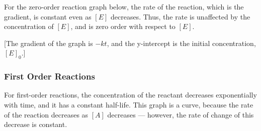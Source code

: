 				For the zero-order reaction graph below, the rate of the reaction, which is the gradient, is constant even as $[E]$ decreases.
				Thus, the rate is unaffected by the concentration of $[E]$, and is zero order with respect to $[E]$.

				[The gradient of the graph is $-kt$, and the y-intercept is the initial concentration, $[E]_{0}$.]





			\pagebreak
			\subsubsection{First Order Reactions}

				For first-order reactions, the concentration of the reactant decreases exponentially with time, and it has a constant half-life.
				This graph is a curve, because the rate of the reaction decreases as $[A]$ decreases --- however, the rate of change of this
				decrease is constant.


